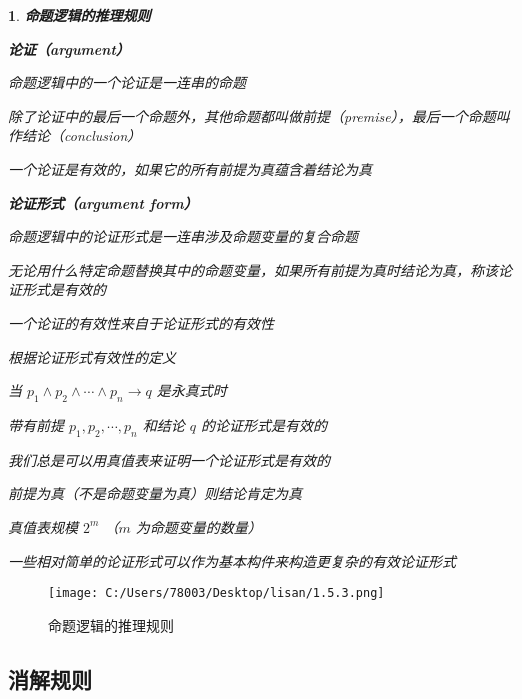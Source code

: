 \documentclass[UTF8]{report}
\theoremstyle{MyLineTheoremStyle} %
\theoremstyle{MyBlockTheoremStyle} %
\theoremstyle{MySubsubsectionStyle} %
\newtheorem{definition}{}
\begin{document}
\begin{definition}
    \textbf{命题逻辑的推理规则}\par
    \vspace{1em} %
    \textbf{论证（argument）}\par
    命题逻辑中的一个论证是一连串的命题\par
    除了论证中的最后一个命题外，其他命题都叫做前提（premise），最后一个命题叫作结论（conclusion）\par
    一个论证是有效的，如果它的所有前提为真蕴含着结论为真\par
    \vspace{1em} %
    \textbf{论证形式（argument form）}\par
    命题逻辑中的论证形式是一连串涉及命题变量的复合命题\par
    无论用什么特定命题替换其中的命题变量，如果所有前提为真时结论为真，称该论证形式是有效的\par
    \vspace{1em} %
    一个论证的有效性来自于论证形式的有效性\par
    根据论证形式有效性的定义\par
    当 $p_1 \land p_2 \land \cdots \land p_n \rightarrow q$ 是永真式时\par
    带有前提 $p_1, p_2, \cdots, p_n$ 和结论 $q$ 的论证形式是有效的\par
    \vspace{1em} %
    我们总是可以用真值表来证明一个论证形式是有效的\par
    前提为真（不是命题变量为真）则结论肯定为真\par
    真值表规模 $2^m$ （$m$ 为命题变量的数量）\par
    \vspace{1em} %
    一些相对简单的论证形式可以作为基本构件来构造更复杂的有效论证形式\par
\end{definition}

\begin{figure}[ht]
\centering
\texttt{[image: C:/Users/78003/Desktop/lisan/1.5.3.png]}
\caption{命题逻辑的推理规则}
\end{figure}

\subsection{消解规则}
\end{document}
